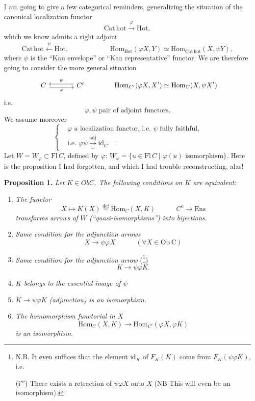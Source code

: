 \documentclass[11pt]{article}
\newcommand{\printedpage}[1]{\marginpar{\footnotesize p.~#1}}
\newcommand{\msp}[1]{\marginpar{\footnotesize [#1]}}
\newcommand{\dfeq}{\overset{\text{def}}{=}}
\newcommand{\Cathot}{\mathrm{Cat\,hot}}
\begin{document}
\msp{page 37}
I am going to give a few categorical reminders, generalizing the situation of the canonical localization functor
\[
\Cathot\xrightarrow{\ \varphi\ }\mathrm{Hot},
\]
which we know admits a right adjoint
\[
\Cathot\xleftarrow{\ \psi\ }\mathrm{Hot}, \qquad\qquad\qquad \mathrm{Hom}_{\mathrm{Hot}}(\varphi X,Y)\simeq\mathrm{Hom}_{\Cathot}(X,\psi Y),
\]
where $\psi$ is the ``Kan envelope'' or ``Kan representative'' functor. We are therefore going to consider the more general situation
\[
\begin{tikzcd}[column sep=large]
C \arrow[r, shift right=1, "\varphi"'] & C' \arrow[l, shift right=1, "\psi"']
\end{tikzcd}
\qquad\qquad \mathrm{Hom}_{C'}(\varphi X,X')\simeq\mathrm{Hom}_{C}(X,\psi X')
\]
i.e.
\[
\varphi,\psi \text{ pair of adjoint functors.}
\]
We assume moreover
\[
\left\{
\begin{aligned}
&\varphi \text{ a localization functor, i.e. } \psi \text{ fully faithful,}\\
&\text{i.e. } \varphi\psi\xrightarrow[\sim]{\text{adj}}\mathrm{id}_{C'} \quad .
\end{aligned}
\right.
\]
Let $W=W_{\varphi}\subset\mathrm{Fl}\,C$, defined by $\varphi$: $W_{\varphi}=\{u\in\mathrm{Fl}\,C\mid\varphi(u)\text{ isomorphism}\}$. Here is the proposition I had forgotten, and which I had trouble reconstructing, alas!

\textbf{Proposition 1.} \textit{Let $K\in \mathit{Ob}C$. The following conditions on $K$ are equivalent:}

\printedpage{23}

\begin{enumerate}
\item[(i)] \textit{The functor}
\[
X\longmapsto K(X)\dfeq\mathrm{Hom}_C(X,K) \qquad\quad C^{o}\longrightarrow\mathrm{Ens}
\]
\textit{transforms arrows of $W$ (``quasi-isomorphisms'') into bijections.}
\item[(i$'$)] \textit{Same condition for the adjunction arrows}
\[
X\longrightarrow\psi\varphi X \qquad\quad (\forall X\in\mathrm{Ob}\ \mathrm{C})
\]
\item[(i$''$)] \textit{Same condition for the adjunction arrow} (\footnote[6]{N.B. It even suffices that the element $\mathrm{id}_K$ of $F_K(K)$ come from $F_K(\psi\varphi K)$, i.e.\par (i$'''$) There exists a retraction of $\psi\varphi X$ onto $X$ (NB This will even be an isomorphism).})
\[
K\longrightarrow\psi\varphi K.
\]
\item[(ii)] \textit{$K$ belongs to the essential image of $\psi$}
\item[(ii$'$)] \textit{$K\longrightarrow\psi\varphi K$ (adjunction) is an isomorphism.}
\item[(ii$''$)] \textit{The homomorphism functorial in $X$}
\[
\mathrm{Hom}_C(X,K)\longrightarrow\mathrm{Hom}_{C'}(\varphi X,\varphi K)
\]
\textit{is an isomorphism.}
\end{enumerate}
\end{document}
